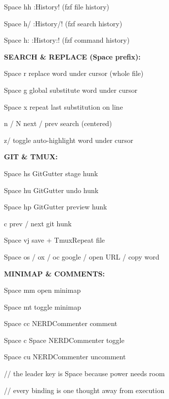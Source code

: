 \documentclass[11pt,a4paper,twoside]{book}
\begin{document}
Space hh              :History! (fzf file history)

Space h/              :History/! (fzf search history)

Space h:              :History:! (fzf command history)


\vspace{12pt}
{\bfseries\color{neonyellow} SEARCH \& REPLACE (Space prefix):}\vspace{4pt}

Space r               replace word under cursor (whole file)

Space g               global substitute word under cursor

Space x               repeat last substitution on line

n / N                 next / prev search (centered)

z/                    toggle auto-highlight word under cursor


\vspace{12pt}
{\bfseries\color{neonyellow} GIT \& TMUX:}\vspace{4pt}

Space hs              GitGutter stage hunk

Space hu              GitGutter undo hunk

Space hp              GitGutter preview hunk

\begin{codebox}
[c / ]c              prev / next git hunk\\
\end{codebox}

Space vj              save + TmuxRepeat file

Space os / ox / oc   google / open URL / copy word


\vspace{12pt}
{\bfseries\color{neonyellow} MINIMAP \& COMMENTS:}\vspace{4pt}

Space mm              open minimap

Space mt              toggle minimap

Space cc              NERDCommenter comment

Space c Space         NERDCommenter toggle

Space cu              NERDCommenter uncomment

// the leader key is Space because power needs room

// every binding is one thought away from execution
\end{document}
